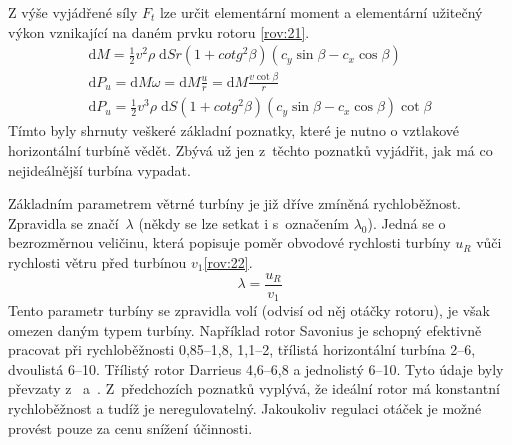 	Z výše vyjádřené síly $F_t$ lze určit elementární moment a elementární užitečný výkon vznikající na daném prvku rotoru \eqref{rov:21}\cite{Rychetnik:Motory}.
	\begin{eqnarray}
		\label{rov:21}
		\mathrm{d}M=\frac{1}{2}v^2\rho \; \mathrm{d}Sr(1+cotg^2 \beta) (c_y\sin\beta - c_x\cos \beta)\nonumber \\
		\mathrm{d}P_u=\mathrm{d}M\omega=\mathrm{d}M\frac{u}{r}=\mathrm{d}M\frac{v \cot\beta}{r}\nonumber \\
		\mathrm{d}P_u=\frac{1}{2}v^3\rho\;\mathrm{d}S(1+cotg^2 \beta)(c_y\sin \beta-c_x\cos\beta)\cot\beta
	\end{eqnarray}
	Tímto byly shrnuty veškeré základní poznatky, které je nutno o vztlakové horizontální turbíně vědět. Zbývá už jen z~těchto poznatků vyjádřit, jak má co nejideálnější turbína vypadat.
	
	Základním parametrem větrné turbíny je již dříve zmíněná rychloběžnost. Zpravidla se značí~$\lambda$ (někdy se lze setkat i s~označením $\lambda_0$). Jedná se o bezrozměrnou veličinu, která popisuje poměr obvodové rychlosti turbíny $u_R$ vůči rychlosti větru před turbínou $v_1$\eqref{rov:22}\cite{Rychetnik:Motory}.
	\begin{equation}
			\label{rov:22}
			\lambda = \frac{u_R}{v_1}
	\end{equation}
	Tento parametr turbíny se zpravidla volí (odvisí od něj otáčky rotoru), je však omezen daným typem turbíny. Například rotor Savonius je schopný efektivně pracovat při rychloběžnosti 0,85–1,8,  1,1–2, třílistá horizontální turbína 2–6, dvoulistá 6–10. Třílistý rotor Darrieus 4,6–6,8 a jednolistý 6–10. Tyto údaje byly převzaty z~\cite{Rychetnik:Motory} a~\cite{ve:ve}. Z~předchozích poznatků vyplývá, že ideální rotor má konstantní rychloběžnost a tudíž je neregulovatelný. Jakoukoliv regulaci otáček je možné provést pouze za cenu snížení účinnosti.
	
